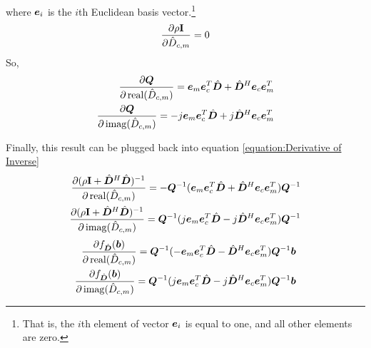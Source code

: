 \begin{appendices}
where $\bm{e}_i$ is the $i$th Euclidean basis vector.\footnote{That is, the $i$th element of vector $\bm{e}_i$ is equal to one, and all other elements are zero.}
\begin{equation}
\frac{\partial \rho{\bf I}}{\partial \hat{D}_{c,m}} = 0
\end{equation}
So,
\begin{equation}
\begin{split}
\frac{\partial \bm{Q}}{\partial 
\operatorname{real}(\hat{D}_{c,m})} = \bm{e}_m\bm{e}_c^T\hat{\bm{D}} + \hat{\bm{D}}^H\bm{e}_c\bm{e}_m^T
\\
\frac{\partial \bm{Q}}{\partial \operatorname{imag}(\hat{D}_{c,m})} = -j\bm{e}_m\bm{e}_c^T\hat{\bm{D}} + j\hat{\bm{D}}^H\bm{e}_c\bm{e}_m^T
\end{split}
\end{equation}

Finally, this result can be plugged back into equation \ref{equation:Derivative of Inverse}
\begin{equation}
\begin{split}
\frac{\partial (\rho{\bf I} + \hat{\bm{D}}^H\hat{\bm{D}})^{-1}}{\partial 
\operatorname{real}(\hat{D}_{c,m})} = -\bm{Q}^{-1}(\bm{e}_m\bm{e}_c^T\hat{\bm{D}} + \hat{\bm{D}}^H\bm{e}_c\bm{e}_m^T )\bm{Q}^{-1}
\\
\frac{\partial (\rho{\bf I} + \hat{\bm{D}}^H\hat{\bm{D}})^{-1}}{\partial \operatorname{imag}(\hat{D}_{c,m})} = \bm{Q}^{-1}(j\bm{e}_m\bm{e}_c^T\hat{\bm{D}} - j\hat{\bm{D}}^H\bm{e}_c\bm{e}_m^T)\bm{Q}^{-1}
\end{split}
\end{equation}
\begin{equation}\label{equation:Partial Dictionary Derivative}
\begin{split}
\frac{\partial f_{\hat{\bm{D}}}(\bm{b})}{\partial 
\operatorname{real}(\hat{D}_{c,m})} = \bm{Q}^{-1}(-\bm{e}_m\bm{e}_c^T\hat{\bm{D}} - \hat{\bm{D}}^H\bm{e}_c\bm{e}_m^T )\bm{Q}^{-1}\bm{b}
\\
\frac{\partial f_{\hat{\bm{D}}}(\bm{b})}{\partial \operatorname{imag}(\hat{D}_{c,m})} = \bm{Q}^{-1}(j\bm{e}_m\bm{e}_c^T\hat{\bm{D}} - j\hat{\bm{D}}^H\bm{e}_c\bm{e}_m^T)\bm{Q}^{-1}\bm{b}
\end{split}
\end{equation}




\end{appendices}
